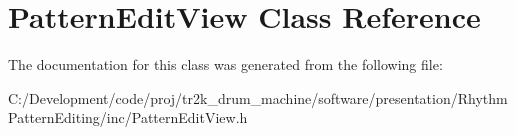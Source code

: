 \hypertarget{class_pattern_edit_view}{}\section{Pattern\+Edit\+View Class Reference}
\label{class_pattern_edit_view}


The documentation for this class was generated from the following file\+:\begin{DoxyCompactItemize}
\item 
C\+:/\+Development/code/proj/tr2k\+\_\+drum\+\_\+machine/software/presentation/\+Rhythm\+Pattern\+Editing/inc/Pattern\+Edit\+View.\+h\end{DoxyCompactItemize}

